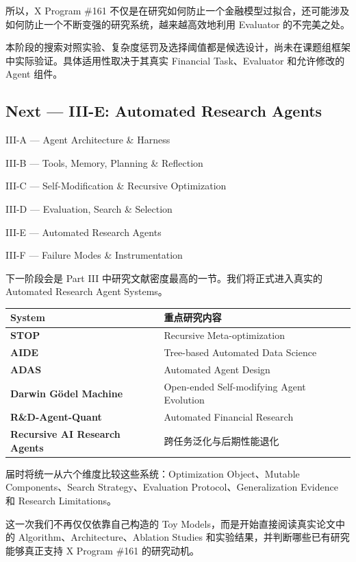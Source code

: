 所以，X Program \#161 不仅是在研究如何防止一个金融模型过拟合，还可能涉及如何防止一个不断变强的研究系统，越来越高效地利用 Evaluator 的不完美之处。

本阶段的搜索对照实验、复杂度惩罚及选择阈值都是候选设计，尚未在课题组框架中实际验证。具体适用性取决于其真实 Financial Task、Evaluator 和允许修改的 Agent 组件。

\hypertarget{part-3-40-0001-next-iii-e-automated-research-agents}{%
\subsection{Next --- III-E: Automated Research Agents}\label{part-3-40-0001-next-iii-e-automated-research-agents}}

III-A --- Agent Architecture \& Harness

III-B --- Tools, Memory, Planning \& Reflection

III-C --- Self-Modification \& Recursive Optimization

III-D --- Evaluation, Search \& Selection

III-E --- Automated Research Agents

III-F --- Failure Modes \& Instrumentation

下一阶段会是 Part III 中研究文献密度最高的一节。我们将正式进入真实的 Automated Research Agent Systems。

\begin{readertable}
\begin{longtable}[]{@{}
  >{\raggedright\arraybackslash}p{}
  >{\raggedright\arraybackslash}p{}@{}}
\toprule
System & 重点研究内容 \\
\midrule
\endhead
\textbf{STOP} & Recursive Meta-optimization \\
\textbf{AIDE} & Tree-based Automated Data Science \\
\textbf{ADAS} & Automated Agent Design \\
\textbf{Darwin Gödel Machine} & Open-ended Self-modifying Agent Evolution \\
\textbf{R\&D-Agent-Quant} & Automated Financial Research \\
\textbf{Recursive AI Research Agents} & 跨任务泛化与后期性能退化 \\
\bottomrule
\end{longtable}
\end{readertable}

届时将统一从六个维度比较这些系统：Optimization Object、Mutable Components、Search Strategy、Evaluation Protocol、Generalization Evidence 和 Research Limitations。

这一次我们不再仅仅依靠自己构造的 Toy Models，而是开始直接阅读真实论文中的 Algorithm、Architecture、Ablation Studies 和实验结果，并判断哪些已有研究能够真正支持 X Program \#161 的研究动机。
